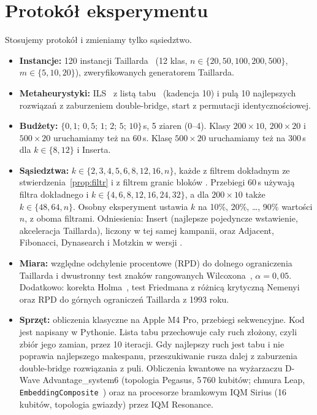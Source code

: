 \documentclass[letterpaper]{article} %
\theoremstyle{definition}
\begin{document}
\section{Protokół eksperymentu}
Stosujemy protokół \citet{wojewodzki2026windowed}
i zmieniamy tylko sąsiedztwo.
\begin{itemize}
\item \textbf{Instancje:} 120 instancji Taillarda~\cite{taillard1993} (12 klas,
      $n\in\{20,50,100,200,500\}$, $m\in\{5,10,20\}$), zweryfikowanych generatorem Taillarda.
\item \textbf{Metaheurystyki:} ILS~\cite{lourenco2003} z listą tabu~\cite{glover1997} (kadencja 10)
      i pulą 10 najlepszych rozwiązań z zaburzeniem double-bridge, start z permutacji identycznościowej.
\item \textbf{Budżety:} $\{0{,}1;\,0{,}5;\,1;\,2;\,5;\,10\}$\,s,
      5 ziaren (0--4). Klasy $200\times 10$, $200\times 20$ i $500\times 20$
      uruchamiamy też na 60\,s. Klasę $500\times 20$ uruchamiamy też na 300\,s
      dla $k\in\{8,12\}$ i Inserta.
\item \textbf{Sąsiedztwa:} $k\in\{2,3,4,5,6,8,12,16,n\}$, każde
      z filtrem dokładnym ze stwierdzenia~\ref{prop:filtr} i z filtrem
      granic bloków \citet{wojewodzki2026windowed}. Przebiegi 60\,s używają filtra
      dokładnego i $k\in\{4,6,8,12,16,24,32\}$, a dla $200\times 10$ także
      $k\in\{48,64,n\}$. Osobny eksperyment ustawia
      $k$ na 10\%, 20\%, \dots, 90\% wartości $n$, z oboma filtrami. Odniesienia: Insert (najlepsze pojedyncze wstawienie,
      akceleracja Taillarda), liczony w tej samej kampanii, oraz Adjacent,
      Fibonacci, Dynasearch i Motzkin w wersji \citet{wojewodzki2026windowed}.
\item \textbf{Miara:} względne odchylenie procentowe (RPD) do dolnego ograniczenia Taillarda i dwustronny test znaków rangowanych Wilcoxona~\cite{wilcoxon1945}, $\alpha=0{,}05$. Dodatkowo: korekta Holma~\cite{holm1979},
      test Friedmana z różnicą krytyczną Nemenyi oraz RPD do górnych ograniczeń
      Taillarda z 1993 roku.
\item \textbf{Sprzęt:} obliczenia klasyczne na Apple M4 Pro, przebiegi
      sekwencyjne. Kod jest napisany w Pythonie. Lista tabu
      przechowuje cały ruch złożony, czyli zbiór jego zamian, przez 10
      iteracji. Gdy najlepszy ruch jest tabu i nie poprawia najlepszego
      makespanu, przeszukiwanie rusza dalej z zaburzenia double-bridge
      rozwiązania z puli. Obliczenia kwantowe na wyżarzaczu D-Wave
      Advantage\_system6 (topologia Pegasus, 5\,760 kubitów; chmura Leap,
      \texttt{EmbeddingComposite}~\cite{choi2008minor}) oraz na procesorze bramkowym IQM
      Sirius (16 kubitów, topologia gwiazdy) przez IQM Resonance.
\end{itemize}
\end{document}
